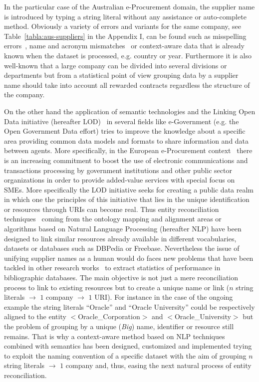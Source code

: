 \documentclass{llncs}
\begin{document}
In the particular case of the Australian e-Procurement domain, the supplier name is introduced by typing a string literal without any assistance or 
auto-complete method. Obviously a variety of errors and variants for the same company, see Table~\ref{tabla:aus-suppliers} in the Appendix I, 
can be found such as misspelling errors~\cite{NorvigSpelling,StanfordSpelling}, name and acronym mismatches~\cite{Yeates99automaticextraction,Ratinov:2004:AES:1025132.1026366} 
or context-aware data that is already known when the dataset is processed, e.g. country or year. Furthermore it is also well-known 
that a large company can be divided into several divisions or departments but from a statistical point of view grouping data by a supplier name 
should take into account all rewarded contracts regardless the structure of the company.

On the other hand the application of semantic technologies and the Linking Open Data initiative (hereafter LOD)~\cite{Berners-Lee-2006,Heath_Bizer_2011}  
in several fields like e-Government (e.g. the Open Government Data effort) tries to improve the knowledge about a specific area providing 
common data models and formats to share information and data between agents. More specifically, in the European e-Procurement 
context~\cite{e-Proc-map-paper} there is an increasing commitment to boost the use of electronic communications and transactions 
processing by government institutions and other public sector organizations in order to provide added-value services with special focus on SMEs. 
More specifically the LOD initiative seeks for creating a public data realm in which one the principles of this initiative that lies in the 
unique identification or resources through URIs can become real. Thus entity reconciliation techniques~\cite{Serimi,conf/www/MaaliCP11} 
coming from the ontology mapping and alignment areas or algorithms based on Natural Language Processing (hereafter NLP) have been 
designed to link similar resources already available in different vocabularies, datasets or databases such as DBPedia or Freebase. 
Nevertheless the issue of unifying supplier names as a human would do faces new problems that have been tackled in 
other research works~\cite{Galvez2006} to extract statistics of performance in bibliographic databases. The main objective is not just a 
mere reconciliation process to link to existing resources but to create a unique name or link ($n$ string literals $\to$ $1$ company $\to$ $1$ URI). 
For instance in the case of the ongoing example the string literals ``Oracle'' and ``Oracle University'' could be respectively aligned to the entity $<$Oracle\_Corporation$>$ and $<$Oracle\_University$>$ but 
the problem of grouping by a unique (\textit{Big}) name, identifier or resource still remains. That is why a context-aware method based on NLP 
techniques combined with semantics has been designed, customized and implemented trying to exploit the naming convention of a specific dataset with the aim 
of grouping $n$ string literals $\to$ $1$ company and, thus, easing the next natural process of entity reconciliation.
\end{document}
